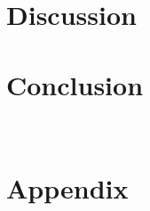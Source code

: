 \documentclass[sigconf,anonymous]{acmart}
\begin{document}
\section{Discussion}


\FloatBarrier
\section{Conclusion}


\makeatletter
{}\
\makeatother


\clearpage
\appendix
\section*{Appendix}

\end{document}
